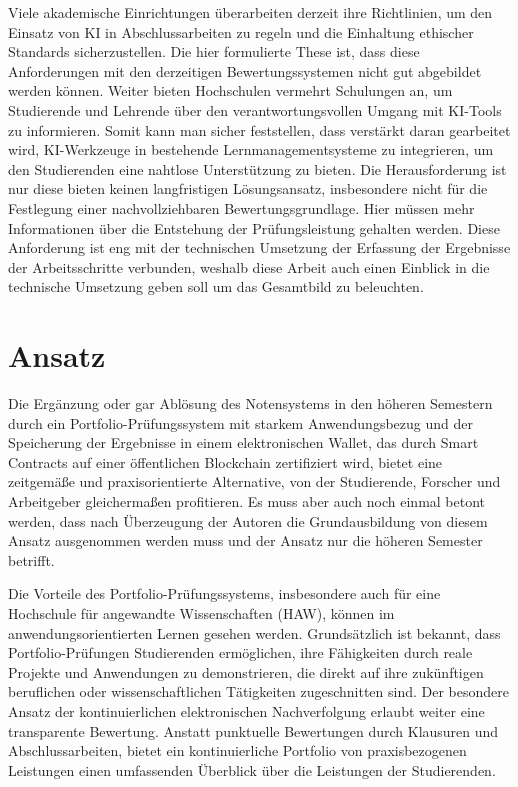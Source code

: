\documentclass[conference]{IEEEtran}
\begin{document}
Viele akademische Einrichtungen überarbeiten derzeit ihre \cite{mrass2023chatgpt} Richtlinien, um den Einsatz von KI in Abschlussarbeiten zu regeln und die Einhaltung ethischer Standards sicherzustellen. Die hier formulierte These ist, dass diese Anforderungen mit den derzeitigen Bewertungssystemen nicht gut abgebildet werden können. Weiter bieten Hochschulen vermehrt Schulungen an, um Studierende und Lehrende über den verantwortungsvollen Umgang mit KI-Tools zu informieren. Somit kann man sicher feststellen, dass verstärkt daran gearbeitet wird, KI-Werkzeuge in bestehende Lernmanagementsysteme zu integrieren, um den Studierenden eine nahtlose Unterstützung zu bieten. Die Herausforderung ist nur diese bieten keinen langfristigen Lösungsansatz, insbesondere nicht für die Festlegung einer nachvollziehbaren Bewertungsgrundlage. Hier müssen mehr Informationen über die Entstehung der Prüfungsleistung gehalten werden.
Diese Anforderung ist eng mit der technischen Umsetzung der Erfassung der Ergebnisse der Arbeitsschritte verbunden, weshalb diese Arbeit auch einen Einblick in die technische Umsetzung geben soll um das Gesamtbild zu beleuchten. 

\section{Ansatz}

Die Ergänzung oder gar Ablösung des Notensystems in den höheren Semestern durch ein Portfolio-Prüfungssystem mit starkem Anwendungsbezug und der Speicherung der Ergebnisse in einem elektronischen Wallet, das durch Smart Contracts auf einer öffentlichen Blockchain zertifiziert wird, bietet eine zeitgemäße und praxisorientierte Alternative, von der Studierende, Forscher und Arbeitgeber gleichermaßen profitieren. Es muss aber auch noch einmal betont werden, dass nach Überzeugung der Autoren die Grundausbildung von diesem Ansatz ausgenommen werden muss und der Ansatz nur die höheren Semester betrifft. 

Die Vorteile des Portfolio-Prüfungssystems, insbesondere auch für eine Hochschule für angewandte Wissenschaften (HAW), können im anwendungsorientierten Lernen gesehen werden. Grundsätzlich ist bekannt, dass Portfolio-Prüfungen Studierenden ermöglichen, ihre Fähigkeiten durch reale Projekte und Anwendungen zu demonstrieren, die direkt auf ihre zukünftigen beruflichen oder wissenschaftlichen Tätigkeiten zugeschnitten sind. Der besondere Ansatz der kontinuierlichen elektronischen Nachverfolgung erlaubt weiter eine transparente Bewertung. Anstatt punktuelle Bewertungen durch Klausuren und Abschlussarbeiten, bietet ein kontinuierliche Portfolio von praxisbezogenen Leistungen einen umfassenden Überblick über die Leistungen der Studierenden.
\end{document}

